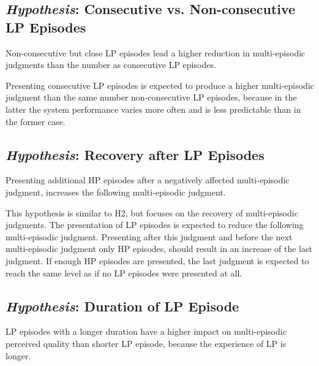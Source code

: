 
\subsection{\emph{Hypothesis}: Consecutive vs. Non-consecutive \ac{LP} Episodes}
\begin{hypothesis}\label{hypo:consecutive}
Non-consecutive but close \ac{LP} episodes lead a higher reduction in multi-episodic judgments than the number as consecutive \ac{LP} episodes.
\end{hypothesis}

Presenting consecutive \ac{LP} episodes is expected to produce a higher multi-episodic judgment than the same number non-consecutive \ac{LP} episodes, because in the latter the system performance varies more often and is less predictable than in the former case.

\subsection{\emph{Hypothesis}: Recovery after \ac{LP} Episodes}
\begin{hypothesis}\label{hypo:recovery}
Presenting additional \ac{HP} episodes after a negatively affected multi-episodic judgment, increases the following multi-episodic judgment.
\end{hypothesis}

This hypothesis is similar to H2, but focuses on the recovery of multi-episodic judgments.
The presentation of \ac{LP} episodes is expected to reduce the following multi-episodic judgment.
Presenting after this judgment and before the next multi-episodic judgment only \ac{HP} episodes, should result in an increase of the last judgment.
If enough \ac{HP} episodes are presented, the last judgment is expected to reach the same level as if no \ac{LP} episodes were presented at all.


\subsection{\emph{Hypothesis}: Duration of \ac{LP} Episode}
\begin{hypothesis}\label{hypo:duration}
\ac{LP} episodes with a longer duration have a higher impact on multi-episodic perceived quality than shorter \ac{LP} episode, because the experience of \ac{LP} is longer.
\end{hypothesis}

